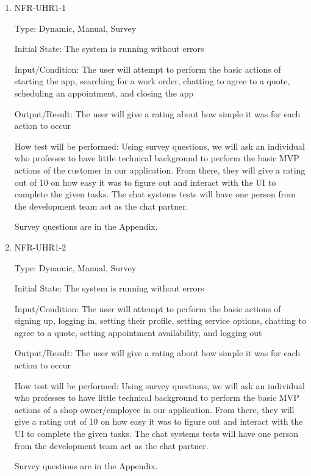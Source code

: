 \documentclass[12pt, titlepage]{article}
\begin{document}
\begin{enumerate}

\item{NFR-UHR1-1\\}

Type: Dynamic, Manual, Survey
					
Initial State: The system is running without errors
					
Input/Condition: The user will attempt to perform the basic actions of starting the app, searching for a work order, chatting to agree to a quote, scheduling an appointment, and closing the app
					
Output/Result: The user will give a rating about how simple it was for each action to occur
					
How test will be performed: Using survey questions, we will ask an individual who professes to have little technical background to perform the basic MVP actions of the customer in our application. From there, they will give a rating out of 10 on how easy it was to figure out and interact with the UI to complete the given tasks. The chat systems tests will have one person from the development team act as the chat partner.

Survey questions are in the Appendix.

\item{NFR-UHR1-2\\}

Type: Dynamic, Manual, Survey
					
Initial State: The system is running without errors
					
Input/Condition: The user will attempt to perform the basic actions of signing up, logging in, setting their profile, setting service options, chatting to agree to a quote, setting appointment availability, and logging out
					
Output/Result: The user will give a rating about how simple it was for each action to occur
					
How test will be performed: Using survey questions, we will ask an individual who professes to have little technical background to perform the basic MVP actions of a shop owner/employee in our application. From there, they will give a rating out of 10 on how easy it was to figure out and interact with the UI to complete the given tasks. The chat systems tests will have one person from the development team act as the chat partner.

Survey questions are in the Appendix.

\end{enumerate}
\end{document}

